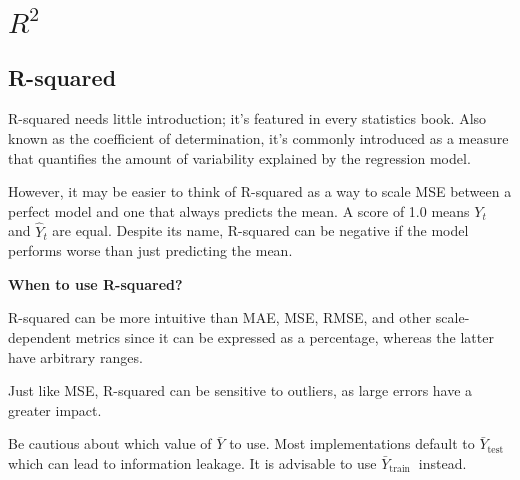 \clearpage
\section{$R^2$}
\subsection{R-squared}
\thispagestyle{regressionstyle}

R-squared needs little introduction; it's featured in every statistics book. Also known as the coefficient of determination, it's commonly introduced as a measure that quantifies the amount of variability explained by the regression model.

\begin{center}
\end{center}

However, it may be easier to think of R-squared as a way to scale MSE between a perfect model and one that always predicts the mean. A score of 1.0 means $Y_t$ and $\hat{Y}_t$ are equal. Despite its name, R-squared can be negative if the model performs worse than just predicting the mean.

\textbf{When to use R-squared?}

R-squared can be more intuitive than MAE, MSE, RMSE, and other scale-dependent metrics since it can be expressed as a percentage, whereas the latter have arbitrary ranges.

{
    \item Just like MSE, R-squared can be sensitive to outliers, as large errors have a greater impact.
    \item Be cautious about which value of $\bar{Y}$ to use. Most implementations default to $\bar{Y}_{\text {test }}$ which can lead to information leakage. It is advisable to use $\bar{Y}_{\text {train }}$ instead.
}


